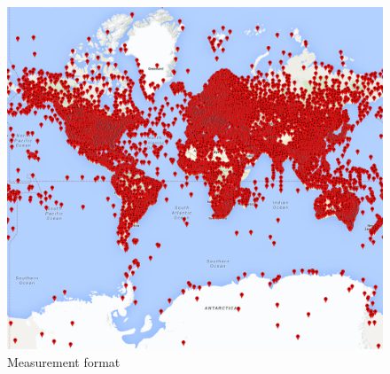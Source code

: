 \documentclass{vldb}
\begin{document}
\begin{figure}[tbh]
\includegraphics[width=1\linewidth]{stations2014}
\caption{Measurement format}
\label{fig:stations2014}
\end{figure}

\clearpage

\balance





\end{document}
